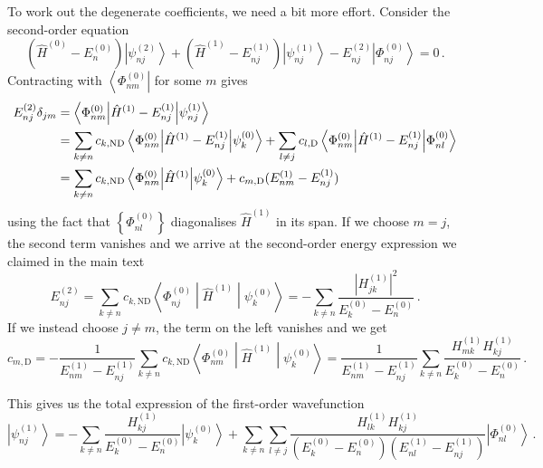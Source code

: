 \documentclass{article}
\theoremstyle{plain}\theoremheaderfont{\normalfont\itshape}\theorembodyfont{\rmfamily}\theoremseparator{.}\newtheorem*{rem}{Remark}\newtheorem*{ex}{Example}\newtheorem*{proof}{Proof}\newtheorem*{altp}{Alternative proof}
\theoremstyle{plain}\theoremheaderfont{\normalfont\bfseries}\theorembodyfont{\rmfamily}\theoremseparator{.}\newtheorem{thm}{Theorem}[section]\newtheorem{lem}[thm]{Lemma}\newtheorem{prop}[thm]{Proposition}\newtheorem*{cor}{Corollary}\newtheorem{defn}[thm]{Definition}\newtheorem{clm}[thm]{Claim}\newtheorem{clminproof}{Claim}
\theoremstyle{break}\theoremheaderfont{\normalfont\itshape}\theorembodyfont{\rmfamily}\theoremseparator{.\medskip}\newtheorem*{proofskip}{Proof}\newtheorem*{exs}{Examples}\newtheorem*{rems}{Remarks}
\theoremstyle{break}\theoremheaderfont{\normalfont\bfseries}\theorembodyfont{\rmfamily}\theoremseparator{.\medskip}\newtheorem{lemskip}[thm]{Lemma}\newtheorem{defnskip}[thm]{Definition}\newtheorem{propskip}[thm]{Proposition}\newtheorem{thmskip}[thm]{Theorem}
\numberwithin{equation}{section}
\newcommand{\bra}[1]{\left\langle #1 \right|}
\newcommand{\ket}[1]{\left| #1 \right\rangle}
\newcommand{\mel}[3]{\left\langle #1 \middle| #2 \middle| #3 \right\rangle}
\newcommand{\abs}[1]{\left| #1 \right|}
\begin{document}
    To work out the degenerate coefficients, we need a bit more effort. Consider the second-order equation
    \begin{equation}
        (\hat{H}^{(0)}-E_n^{(0)})\ket{\psi_{nj}^{(2)}}+(\hat{H}^{(1)}-E_{nj}^{(1)})\ket{\psi_{nj}^{(1)}}-E_{nj}^{(2)}\ket{\Phi_{nj}^{(0)}}=0\,.
    \end{equation}
    Contracting with \(\bra{\Phi_{nm}^{(0)}}\) for some \(m\) gives
    \begin{align}
        E_{nj}^{(2)}\delta_{jm}&=\mel{\Phi_{nm}^{(0)}}{\hat{H}^{(1)}-E_{nj}^{(1)}}{\psi_{nj}^{(1)}}\notag\\
        &=\sum_{k\ne n}c_{k,\text{ND}}\mel{\Phi_{nm}^{(0)}}{\hat{H}^{(1)}-E_{nj}^{(1)}}{\psi_k^{(0)}}+\sum_{l\ne j}c_{l,\text{D}}\mel{\Phi_{nm}^{(0)}}{\hat{H}^{(1)}-E_{nj}^{(1)}}{\Phi_{nl}^{(0)}}\notag\\
        &=\sum_{k\ne n}c_{k,\text{ND}}\mel{\Phi_{nm}^{(0)}}{\hat{H}^{(1)}}{\psi_k^{(0)}}+c_{m,\text{D}}(E_{nm}^{(1)}-E_{nj}^{(1)})
    \end{align}
    using the fact that \(\left\{\Phi_{nl}^{(0)}\right\}\) diagonalises \(\hat{H}^{(1)}\) in its span. If we choose \(m=j\), the second term vanishes and we arrive at the second-order energy expression we claimed in the main text
    \begin{equation}
        E_{nj}^{(2)}=\sum_{k\ne n}c_{k,\text{ND}}\mel{\Phi_{nj}^{(0)}}{\hat{H}^{(1)}}{\psi_k^{(0)}}=-\sum_{k\ne n}\frac{\abs{H_{jk}^{(1)}}^2}{E_k^{(0)}-E_n^{(0)}}\,.
    \end{equation}
    If we instead choose \(j\ne m\), the term on the left vanishes and we get
    \begin{equation}
        c_{m,\text{D}}=-\frac{1}{E_{nm}^{(1)}-E_{nj}^{(1)}}\sum_{k\ne n}c_{k,\text{ND}}\mel{\Phi_{nm}^{(0)}}{\hat{H}^{(1)}}{\psi_k^{(0)}}=\frac{1}{E_{nm}^{(1)}-E_{nj}^{(1)}}\sum_{k\ne n}\frac{H_{mk}^{(1)}H_{kj}^{(1)}}{E_k^{(0)}-E_n^{(0)}}\,.
    \end{equation}

    This gives us the total expression of the first-order wavefunction
    \begin{equation}
        \ket{\psi_{nj}^{(1)}}=-\sum_{k\ne n}\frac{H_{kj}^{(1)}}{E_k^{(0)}-E_n^{(0)}}\ket{\psi_k^{(0)}}+\sum_{k\ne n}\sum_{l\ne j}\frac{H_{lk}^{(1)}H_{kj}^{(1)}}{(E_k^{(0)}-E_n^{(0)})(E_{nl}^{(1)}-E_{nj}^{(1)})}\ket{\Phi_{nl}^{(0)}}\,.
    \end{equation}
\end{document}
